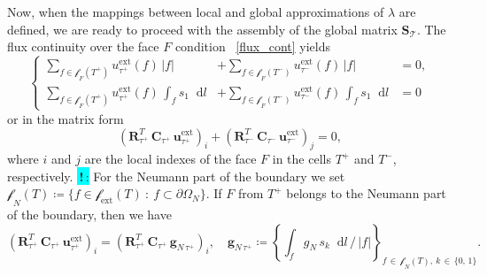 \documentclass[12pt]{article}
\newcommand{\vect}[1]{\boldsymbol{\mathbf{#1}}}
\newcommand{\bcell}{T}
\newcommand{\bmesh}{{\vect{\mathcal T}}}
\newcommand{\mmesh}{{\vect{\mathcal \tau}}}
\newcommand{\mfaces}[1][]{{\vect{\mathcal f}_{\text{#1}}}}
\newcommand{\toDiscuss}[1]{\colorbox{Cyan}{\textbf{\,!\,}:} #1}
\newcommand*\diff{\mathop{}\!\mathrm{d}}
\begin{document}
Now, when the mappings between local and global approximations of $\lambda$ are defined, we are ready to proceed with the assembly of the global matrix $\vect S_\bmesh$. 	The flux continuity over the face $F$ condition ~\eqref{flux_cont} yields
\begin{equation*}
	\left\{\begin{split}
		\sum_{f\in \mfaces_F(T^+)} u^{\text{ext}}_{\mmesh^+}(f)\,|f| &+ \sum_{f\in \mfaces_F(T^-)} u^{\text{ext}}_{\mmesh^-}(f)\,|f| &= 0, \\
		\sum_{f\in \mfaces_F(T^+)} u^{\text{ext}}_{\mmesh^+}(f)\,\int_{f} s_1 \diff{l} &+ \sum_{f\in \mfaces_F(T^-)} u^{\text{ext}}_{\mmesh^-}(f)\,\int_{f} s_1 \diff{l} &= 0
	\end{split}\right.
\end{equation*}
or in the matrix form
\begin{equation}\label{eq:aux1}
	\left( \vect R^T_{\mmesh^+}\,\vect C_{\mmesh^+}\,{\vect u}^{\text{ext}}_{\mmesh^+} \right)_i + \left( \vect R^T_{\mmesh^-}\,\vect C_{\mmesh^-}\,{\vect u}^{\text{ext}}_{\mmesh^-} \right)_j = 0,
\end{equation}
where $i$ and $j$ are the local indexes of the face $F$ in the cells $T^+$ and $T^-$, respectively. \toDiscuss{For} the Neumann part of the boundary we set $\mfaces_N(\bcell) \coloneqq \{ f \in \mfaces[ext](\bcell)\::\:f \subset \partial\Omega_N \}$. If $F$ from $T^+$ belongs to the Neumann part of the boundary, then we have
\begin{equation*}
	\left( \vect R^T_{\mmesh^+}\,\vect C_{\mmesh^+}\,{\vect u}^{\text{ext}}_{\mmesh^+} \right)_i = \left( \vect R^T_{\mmesh^+}\,\vect C_{\mmesh^+}\,{\vect g}_{N\,\mmesh^+} \right)_i, \quad
	{\vect g}_{N\,\mmesh^+} \coloneqq \left\{ \int_f g_N\,s_k \diff{l}\,/\,|f| \right\}_{f\,\in\,\mfaces_N(\bcell),\:k\,\in\,\{0,\,1\}}.
\end{equation*}
	
\end{document}
